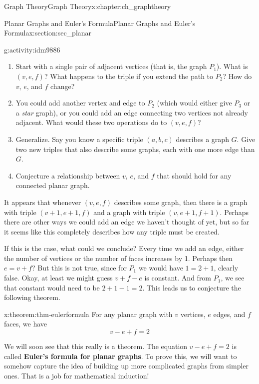 \documentclass[oneside,10pt,]{book}
\newcommand{\terminology}[1]{\textbf{#1}}
\numberwithin{equation}{chapter}
\begin{document}
\begin{chapterptx}{Graph Theory}{}{Graph Theory}{}{}{x:chapter:ch_graphtheory}
\begin{sectionptx}{Planar Graphs and Euler's Formula}{}{Planar Graphs and Euler's Formula}{}{}{x:section:sec_planar}
\begin{introduction}{}
\begin{activity}{}{g:activity:idm9886}
\begin{enumerate}[font=\bfseries,label=(\alph*),ref=\alph*]
\item{}Start with a single pair of adjacent vertices (that is, the graph \(P_1\)).  What is \((v,e,f)\)?  What happens to the triple if you extend the path to \(P_2\)?  How do \(v\), \(e\), and \(f\) change?%
\item{}You could add another vertex and edge to \(P_2\) (which would either give \(P_3\) or a \emph{star} graph), or you could add an edge connecting two vertices not already adjacent.  What would these two operations do to \((v,e,f)\)?%
\item{}Generalize.  Say you know a specific triple \((a,b,c)\) describes a graph \(G\).  Give two new triples that also describe some graphs, each with one more edge than \(G\).%
\item{}Conjecture a relationship between \(v\), \(e\), and \(f\) that should hold for any connected planar graph.%
\end{enumerate}
\end{activity}
It appears that whenever \((v,e,f)\) describes some graph, then there is a graph with triple \((v+1, e+1, f)\) and a graph with triple \((v,e+1, f+1)\).  Perhaps there are other ways we could add an edge we haven't thought of yet, but so far it seems like this completely describes how any triple must be created.%
\par
If this is the case, what could we conclude?  Every time we add an edge, either the number of vertices or the number of faces increases by 1.  Perhaps then \(e = v + f\)?  But this is not true, since for \(P_1\) we would have \(1 = 2 + 1\), clearly false.  Okay, at least we might guess \(v + f - e\) is constant.  And from \(P_1\), we see that constant would need to be \(2 + 1 - 1 = 2\).  This leads us to conjecture the following theorem.%
\begin{theorem}{}{}{x:theorem:thm-eulerformula}%
For any planar graph with \(v\) vertices, \(e\) edges, and \(f\) faces, we have%
\begin{equation*}
v - e + f = 2
\end{equation*}
%
\end{theorem}
We will soon see that this really is a theorem.  The equation \(v-e+f = 2\) is called \terminology{Euler's formula for planar graphs}.  To prove this, we will want to somehow capture the idea of building up more complicated graphs from simpler ones.  That is a job for mathematical induction!%
\end{introduction}%

\end{sectionptx}
\end{chapterptx}
\end{document}
